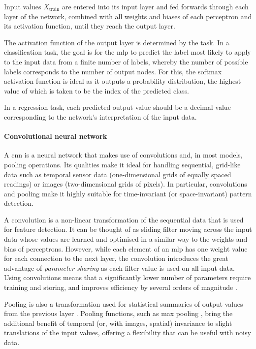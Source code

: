 Input values \(X_{\text{train}}\) are entered into its input layer and fed forwards through each layer of the network, combined with all weights and biases of each perceptron and its activation function, until they reach the output layer.

The activation function of the output layer is determined by the task. In a classification task, the goal is for the \ac{mlp} to predict the label most likely to apply to the input data from a finite number of labels, whereby the number of possible labels corresponds to the number of output nodes. For this, the softmax activation function is ideal \cite[p. 184]{goodfellow_deep_2016} as it outputs a probability distribution, the highest value of which is taken to be the index of the predicted class.

In a regression task, each predicted output value should be a decimal value corresponding to the network's interpretation of the input data.

\paragraph{Convolutional neural network}
A \ac{cnn} is a neural network that makes use of convolutions and, in most models, pooling operations. Its qualities make it ideal for handling sequential, grid-like data such as temporal sensor data (one-dimensional grids of equally spaced readings) or images (two-dimensional grids of pixels). In particular, convolutions and pooling make it highly suitable for time-invariant (or space-invariant) pattern detection. \cite[]{goodfellow_deep_2016}

A convolution is a non-linear transformation of the sequential data that is used for feature detection. It can be thought of as sliding filter moving across the input data whose values are learned and optimised in a similar way to the weights and bias of perceptrons. However, while each element of an \ac{mlp} has one weight value for each connection to the next layer, the convolution introduces the great advantage of \textit{parameter sharing} as each filter value is used on all input data. Using convolutions means that a significantly lower number of parameters require training and storing, and improves efficiency by several orders of magnitude \cite[]{goodfellow_deep_2016}.

Pooling is also a transformation used for statistical summaries of output values from the previous layer \cite[]{goodfellow_deep_2016}. Pooling functions, such as max pooling \cite[]{zhou_computation_1988}, bring the additional benefit of temporal (or, with images, spatial) invariance to slight translations of the input values, offering a flexibility that can be useful with noisy data.

